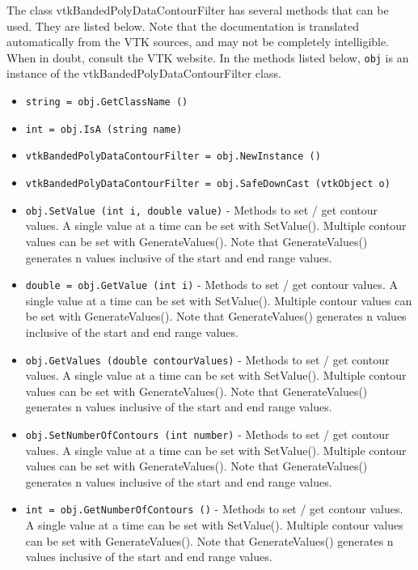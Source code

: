 The class vtkBandedPolyDataContourFilter has several methods that can be used.
  They are listed below.
Note that the documentation is translated automatically from the VTK sources,
and may not be completely intelligible.  When in doubt, consult the VTK website.
In the methods listed below, \verb|obj| is an instance of the vtkBandedPolyDataContourFilter class.
\begin{itemize}
\item  \verb|string = obj.GetClassName ()|

\item  \verb|int = obj.IsA (string name)|

\item  \verb|vtkBandedPolyDataContourFilter = obj.NewInstance ()|

\item  \verb|vtkBandedPolyDataContourFilter = obj.SafeDownCast (vtkObject o)|

\item  \verb|obj.SetValue (int i, double value)| -  Methods to set / get contour values. A single value at a time can be
 set with SetValue(). Multiple contour values can be set with
 GenerateValues(). Note that GenerateValues() generates n values
 inclusive of the start and end range values.

\item  \verb|double = obj.GetValue (int i)| -  Methods to set / get contour values. A single value at a time can be
 set with SetValue(). Multiple contour values can be set with
 GenerateValues(). Note that GenerateValues() generates n values
 inclusive of the start and end range values.

\item  \verb|obj.GetValues (double contourValues)| -  Methods to set / get contour values. A single value at a time can be
 set with SetValue(). Multiple contour values can be set with
 GenerateValues(). Note that GenerateValues() generates n values
 inclusive of the start and end range values.

\item  \verb|obj.SetNumberOfContours (int number)| -  Methods to set / get contour values. A single value at a time can be
 set with SetValue(). Multiple contour values can be set with
 GenerateValues(). Note that GenerateValues() generates n values
 inclusive of the start and end range values.

\item  \verb|int = obj.GetNumberOfContours ()| -  Methods to set / get contour values. A single value at a time can be
 set with SetValue(). Multiple contour values can be set with
 GenerateValues(). Note that GenerateValues() generates n values
 inclusive of the start and end range values.


\end{itemize}
